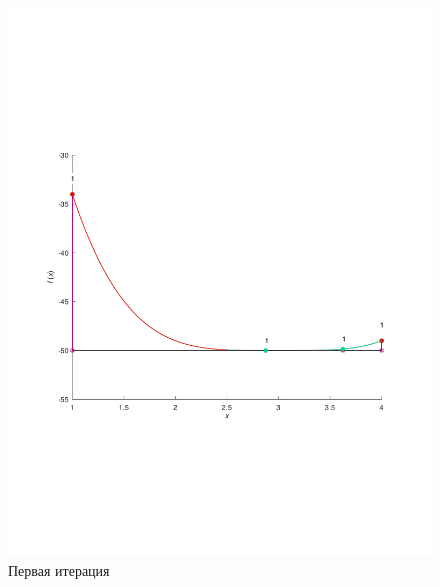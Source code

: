 \documentclass[a4paper,12pt]{article}
\begin{document}
    \begin{figure}[H]
        \centering
        \includegraphics[scale=0.4]{1Bolcanoitter.pdf}
        \caption{Первая итерация}
    \end{figure}
\end{document}
